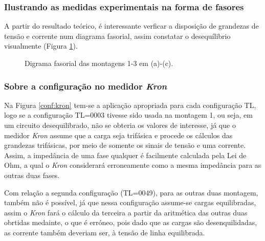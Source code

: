 \documentclass[a4paper,12pt,oneside,openany,table,xcdraw]{article}
\begin{document}
\subsubsection{Ilustrando as medidas experimentais na forma de fasores}
A partir do resultado teórico, é interessante verficar a disposição de grandezas de tensão e corrente num diagrama fasorial, assim constatar o desequílibrio visualmente (Figura \ref{fasores}).
\vspace{0.15cm}
\begin{figure}[H]
\centering
{}\hfill
{}\hfill
{}
\caption{Digrama fasorial das montagens 1-3 em (a)-(c).}
\label{fasores}
\end{figure}
\vspace{0.2cm}

\subsubsection{Sobre a configuração no medidor \emph{Kron}}
Na Figura \ref{conf:kron} tem-se a aplicação apropriada para cada configuração TL, logo se a configuração TL=0003 tivesse sido usada na montagem 1, ou seja, em um circuito desequilibrado, não se obteria os valores de interesse, já que o medidor \emph{Kron} assume que a carga seja trifásica e procede os cálculos das grandezas trifásicas, por meio de somente os sinais de tensão e uma corrente. Assim, a impedância de uma fase qualquer é facilmente calculada pela Lei de Ohm, a qual o \emph{Kron} considerará erroneamente como a mesma impedância para as outras duas fases.

Com relação a segunda configuração (TL=0049), para as outras duas montagem, também não é possível, já que nessa configuração assume-se cargas equilibradas, assim o \emph{Kron} fará o cálculo da  terceira a partir da aritmética das outras duas obrtidas medainte, o que é erróneo, pois dado que as cargas são desenquilidadas, as corrente também deveriam ser, à tensão de linha equilibrada.  
\end{document}
